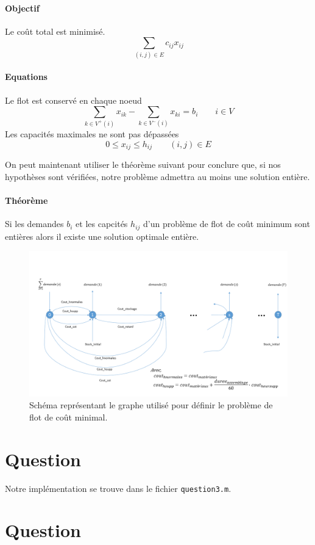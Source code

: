 \documentclass[12pt,oneside,a4paper]{article}
\newcommand{\question}
{
\addtocounter{section}{1}
\section*{Question \thesection}
}
\begin{document}
\paragraph{Objectif}
Le coût total est minimisé.
\[ \sum_{(i, j) \in E} c_{ij} x_{ij} \]
\paragraph{Equations} Le flot est conservé en chaque noeud
\[ \sum_{k \in V^{+}(i)} x_{ik} - \sum_{k \in V^{-}(i)} x_{ki} 
  = b_i \qquad i \in V
\]
Les capacités maximales ne sont pas dépassées
\[ 0 \leq x_{ij} \leq h_{ij} \qquad (i, j) \in E \]

On peut maintenant utiliser le théorème suivant pour conclure que, si nos hypothèses sont vérifiées, notre problème admettra au moins une solution entière.
\paragraph{Théorème}
Si les demandes $b_i$ et les capcités $h_{ij}$ d'un problème de flot de coût minimum sont entières alors il existe une solution optimale entière.

\begin{figure}[hp]
	\centering
		\includegraphics[scale = 0.5]{Schema_flot.png}
	\caption{Schéma représentant le graphe utilisé pour définir 
  le problème de flot de coût minimal.}
	\label{fig:schemaFlot}
\end{figure}

\question %

Notre implémentation se trouve dans le fichier \texttt{question3.m}.

\question %
\end{document}

